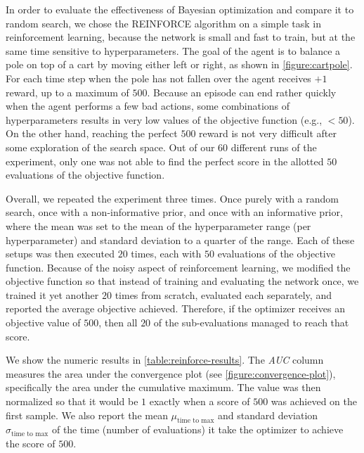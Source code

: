 In order to evaluate the effectiveness of Bayesian optimization and compare it to random search, we chose the REINFORCE algorithm on a simple task in reinforcement learning, because the network is small and fast to train, but at the same time sensitive to hyperparameters. The goal of the agent is to balance a pole on top of a cart by moving either left or right, as shown in \autoref{figure:cartpole}. For each time step when the pole has not fallen over the agent receives $+1$ reward, up to a maximum of $500$. Because an episode can end rather quickly when the agent performs a few bad actions, some combinations of hyperparameters results in very low values of the objective function (e.g., $< 50$). On the other hand, reaching the perfect $500$ reward is not very difficult after some exploration of the search space. Out of our $60$ different runs of the experiment, only one was not able to find the perfect score in the allotted $50$ evaluations of the objective function.

Overall, we repeated the experiment three times. Once purely with a random search, once with a non-informative prior, and once with an informative prior, where the mean was set to the mean of the hyperparameter range (per hyperparameter) and standard deviation to a quarter of the range. Each of these setups was then executed $20$ times, each with $50$ evaluations of the objective function. Because of the noisy aspect of reinforcement learning, we modified the objective function so that instead of training and evaluating the network once, we trained it yet another $20$ times from scratch, evaluated each separately, and reported the average objective achieved. Therefore, if the optimizer receives an objective value of $500$, then all $20$ of the sub-evaluations managed to reach that score.

We show the numeric results in \autoref{table:reinforce-results}. The \emph{AUC} column measures the area under the convergence plot (see \autoref{figure:convergence-plot}), specifically the area under the cumulative maximum. The value was then normalized so that it would be $1$ exactly when a score of $500$ was achieved on the first sample. We also report the mean $\mu_{\text{time to max}}$ and standard deviation $\sigma_{\text{time to max}}$ of the time (number of evaluations) it take the optimizer to achieve the score of $500$.

